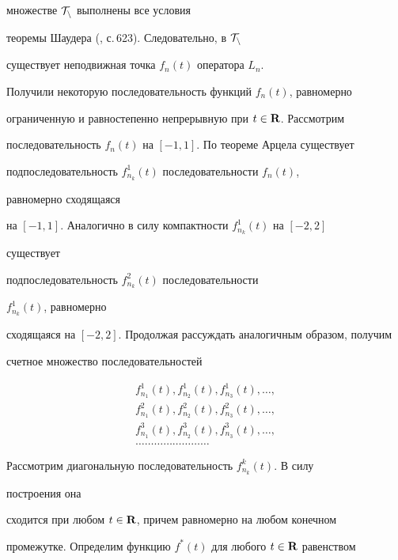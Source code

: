 \begin{pf}
множестве $\cal T_n$ выполнены все условия 


теоремы Шаудера (\cite{7}, с.\,623). Следовательно, в $\cal T_n$ 


существует неподвижная точка $f_n(t)$ оператора $L_n$. 


 


Получили некоторую последовательность функций $f_n(t)$, равномерно 


ограниченную и равностепенно непрерывную при $t\in\bold R$. Рассмотрим 


последовательность $f_n(t)$ на $[-1,1]$. По теореме Арцела существует 


подпоследовательность $f^1_{n_k}(t)$ последовательности $f_n(t)$, 


равномерно сходящаяся 


на $[-1,1]$. Аналогично в силу компактности $f^1_{n_k}(t)$ на $[-2,2]$ 


существует 


подпоследовательность $f^2_{n_k}(t)$ последовательности 


$f^1_{n_k}(t)$, равномерно 


сходящаяся на $[-2,2]$. Продолжая рассуждать аналогичным образом, получим 


счетное множество последовательностей 


\begin{gather*} 


f^1_{n_1}(t),f^1_{n_2}(t),f^1_{n_3}(t),\dotsc, \\ 


f^2_{n_1}(t),f^2_{n_2}(t),f^2_{n_3}(t),\dotsc, \\ 


f^3_{n_1}(t),f^3_{n_2}(t),f^3_{n_3}(t),\dotsc, \\ 


\dotsc\dotsc\dotsc\dotsc\dotsc\dotsc\dotsc\dotsc 


\end{gather*} 





Рассмотрим диагональную последовательность $f^k_{n_k}(t)$. В силу 


построения она 


сходится при любом $t\in\bold R$, причем равномерно на любом конечном 


промежутке. Определим функцию $f^*(t)$ для любого $t\in\bold R$ равенством 


$$ 



\end{pf}
